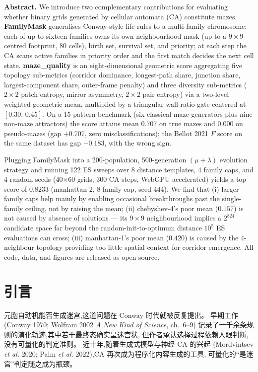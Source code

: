 \documentclass[11pt,a4paper]{article}
\newcommand{\cin}{Vermilion}
\begin{document}
\vspace{0.8em}

\noindent\textbf{\color{\cin}Abstract.}\quad
We introduce two complementary contributions for evaluating
whether binary grids generated by cellular automata (CA) constitute mazes.
\textbf{FamilyMask} generalises Conway-style life rules to a multi-family chromosome:
each of up to sixteen families owns its own neighbourhood mask (up to a $9\times 9$
centred footprint, 80 cells), birth set, survival set, and priority;
at each step the CA scans active families in priority order and the first match
decides the next cell state.
\textbf{maze\_quality} is an eight-dimensional geometric score aggregating
five topology sub-metrics (corridor dominance, longest-path share, junction share,
largest-component share, outer-frame penalty) and three diversity sub-metrics
($2\times 2$ patch entropy, mirror asymmetry, $2\times 2$ pair entropy) via a
two-level weighted geometric mean, multiplied by a triangular wall-ratio gate
centered at $[0.30,\,0.45]$.
On a 15-pattern benchmark (six classical maze generators plus nine non-maze
attractors) the score attains mean $0.707$ on true mazes and $0.000$ on
pseudo-mazes (gap $+0.707$, zero misclassifications); the Bellot 2021 $F$ score
on the same dataset has gap $-0.183$, with the wrong sign.

Plugging FamilyMask into a 200-population, 500-generation $(\mu+\lambda)$
evolution strategy and running 122 ES sweeps over 8 distance templates,
4 family caps, and 4 random seeds (40$\times$60 grids, 300 CA steps,
WebGPU-accelerated) yields a top score of $0.8233$ (manhattan-2, 8-family
cap, seed 444). We find that (i) larger family caps help mainly by enabling
occasional breakthroughs past the single-family ceiling, not by raising the
mean; (ii) chebyshev-4's poor mean ($0.157$) is not caused by absence of
solutions --- its $9\times 9$ neighbourhood implies a $2^{824}$ candidate
space far beyond the random-init-to-optimum distance $10^5$ ES evaluations can
cross; (iii) manhattan-1's poor mean ($0.420$) is caused by the 4-neighbour
topology providing too little spatial context for corridor emergence.
All code, data, and figures are released as open source.

\vspace{1.2em}

\section{引言}
元胞自动机能否生成迷宫,这道问题在 Conway 时代就被反复提出。
早期工作 (Conway 1970; Wolfram 2002 \textit{A New Kind of Science}, ch.\ 6--9)
记录了一千余条规则的演化轨迹,其中若干最终态确实呈迷宫状,
但作者承认选择过程依赖人眼判断,没有可量化的判定准则。
近十年,随着生成式模型与神经 CA 的兴起 (Mordvintsev \textit{et al.} 2020;
Palm \textit{et al.} 2022),CA 再次成为程序化内容生成的工具,
可量化的``是迷宫''判定随之成为瓶颈。
\end{document}
